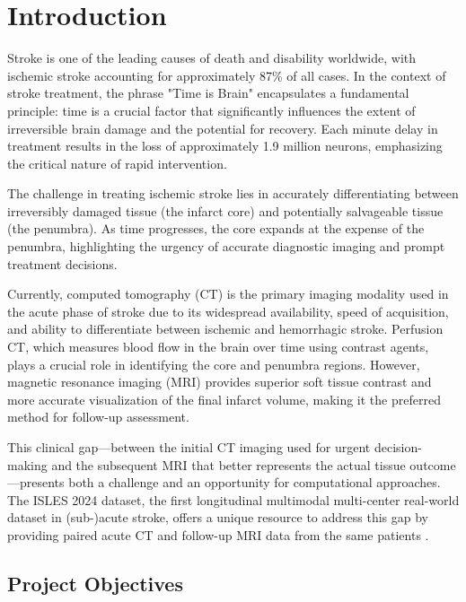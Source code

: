 
\chapter{Introduction}\label{chapter:introduction}

Stroke is one of the leading causes of death and disability worldwide, with ischemic stroke accounting for approximately 87\% of all cases. In the context of stroke treatment, the phrase "Time is Brain" encapsulates a fundamental principle: time is a crucial factor that significantly influences the extent of irreversible brain damage and the potential for recovery. Each minute delay in treatment results in the loss of approximately 1.9 million neurons, emphasizing the critical nature of rapid intervention.

The challenge in treating ischemic stroke lies in accurately differentiating between irreversibly damaged tissue (the infarct core) and potentially salvageable tissue (the penumbra). As time progresses, the core expands at the expense of the penumbra, highlighting the urgency of accurate diagnostic imaging and prompt treatment decisions.

Currently, computed tomography (CT) is the primary imaging modality used in the acute phase of stroke due to its widespread availability, speed of acquisition, and ability to differentiate between ischemic and hemorrhagic stroke. Perfusion CT, which measures blood flow in the brain over time using contrast agents, plays a crucial role in identifying the core and penumbra regions. However, magnetic resonance imaging (MRI) provides superior soft tissue contrast and more accurate visualization of the final infarct volume, making it the preferred method for follow-up assessment.

This clinical gap—between the initial CT imaging used for urgent decision-making and the subsequent MRI that better represents the actual tissue outcome—presents both a challenge and an opportunity for computational approaches. The ISLES 2024 dataset, the first longitudinal multimodal multi-center real-world dataset in (sub-)acute stroke, offers a unique resource to address this gap by providing paired acute CT and follow-up MRI data from the same patients \cite{riedel2024isles}.

\section{Project Objectives}

